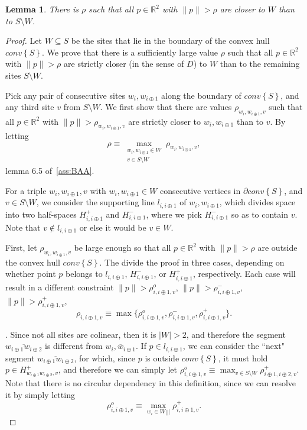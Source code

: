 \documentclass[11pt]{article}
\newtheorem{lemma}{Lemma}
\newcommand{\Sites}{S}
\newcommand{\CHS}{{conv}\left\{\Sites\right\}}
\begin{document}
\begin{lemma}\label{lem:VW}
	There is $\rho$ such that all $p\in\mathbb{R}^2$ with $\|p\| > \rho$  are closer to $W$ than to $\Sites\setminus W$. 
\end{lemma}
\begin{proof}


Let $W\subseteq S$ be the sites that lie in the boundary of the convex hull $\CHS$. 
We prove that there is a sufficiently large value $\rho$ such that all $p\in\mathbb{R}^2$ with $\|p\|>\rho$
	are strictly closer (in the sense of $D$) to $W$ than to the remaining sites $S\setminus W$. 

Pick any pair of consecutive sites $w_i,w_{i\oplus 1}$ along the boundary of $\CHS$, and any third site $v$ from $S\setminus W$. 
We first show that there are values $\rho_{w_i,w_{i\oplus 1},v}$ such that all $p\in\mathbb{R}^2$ with $\|p\|>\rho_{w_i,w_{i\oplus 1},v}$
	are strictly closer to $w_i,w_{i\oplus 1}$ than to $v$. 
By letting
	\[ \rho \equiv \displaystyle{\max_{\substack{w_i,w_{i\oplus 1} \in W \\ v \in S\setminus W}} 
		\rho_{w_i,w_{i\oplus 1},v}}, \]
	lemma 6.5 of~\ref{ass:BAA}. 


For a triple $w_i,w_{i\oplus 1},v$ with $w_i,w_{i\oplus 1}\in W$ consecutive vertices in $\partial\CHS$, and $v\in S\setminus W$, 
	we consider the supporting line $l_{i,{i\oplus 1}}$ of $w_i,w_{i\oplus 1}$, 
		which divides space into two half-spaces $H^{+}_{i,{i\oplus 1}}$ and $H^{-}_{i,{i\oplus 1}}$, 
	where we pick $H^{-}_{i,{i\oplus 1}}$ so as to contain $v$. 
Note that $v\notin l_{i,{i\oplus 1}}$ or else it would be $v\in W$. 

First, let $\rho_{w_i,w_{i\oplus 1},v}$ be large enough so that all $p\in\mathbb{R}^2$ with $\|p\| > \rho$ are outside the convex hull $\CHS$. 
The divide the proof in three cases, 
depending on whether 
	point $p$ belongs to $l_{i,{i\oplus 1}}$, $H^{-}_{i,{i\oplus 1}}$, or $H^{+}_{i,{i\oplus 1}}$, respectively. 
Each case will result in a different constraint $\|p\| > \rho^{o}_{i,i\oplus 1, v}$, $\|p\| > \rho^{-}_{i,i\oplus 1, v}$, $\|p\| > \rho^{+}_{i,i\oplus 1, v}$, 
	\[ \rho_{i,i\oplus 1, v} \equiv \max\{\rho^{o}_{i,i\oplus 1, v},  \rho^{-}_{i,i\oplus 1, v},  \rho^{+}_{i,i\oplus 1, v} \}. \]
	

\vspace*{0.1in}.
Since not all sites are colinear, then it is $|W| > 2$, and therefore the segment $\overline{w_{i\oplus 1} w_{i\oplus 2}}$ 
	is different from $\overline{w_i,w_{i\oplus 1}}$. 
If $p\in l_{i,{i\oplus 1}}$, 
	we can consider the ``next" segment $\overline{w_{i\oplus 1} w_{i\oplus 2}}$, 
	for which, since  $p$ is outside $\CHS$, it must hold 
	$p\in H^{+}_{w_{i\oplus 1} w_{i\oplus 2}, v}$, 
	and therefore we can simply let $\rho^{o}_{i,i\oplus 1, v} \equiv \max_{v\in S\setminus W} \rho^{+}_{i\oplus 1, i\oplus 2, v}$. 
Note that there is no circular dependency in this definition, since we can resolve it by simply 
	letting 
	\[ \rho^{o}_{i,i\oplus 1, v} \equiv \displaystyle{\max_{w_i\in W |||}  \rho^{+}_{i, i\oplus 1, v}}. \]
	





\end{proof}
\end{document}
